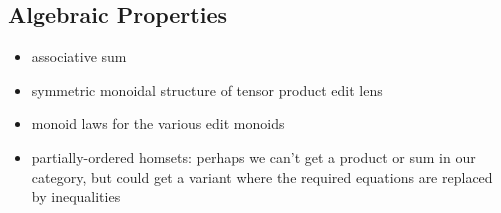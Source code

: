 \subsection{Algebraic Properties}
\label{sec:future-algebra}
\begin{itemize}
    \item associative sum
    \item symmetric monoidal structure of tensor product edit lens
    \item monoid laws for the various edit monoids
    \item partially-ordered homsets: perhaps we can't get a product or sum
        in our category, but could get a variant where the required
        equations are replaced by inequalities
\end{itemize}

